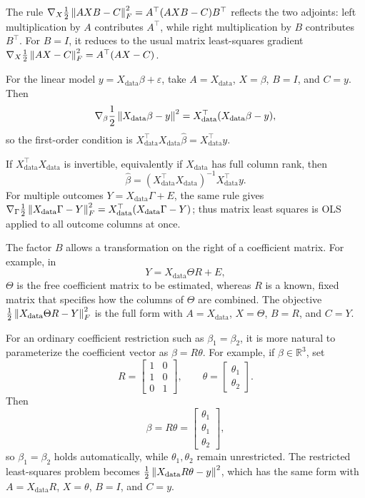 \begin{remark}
The rule $\nabla_X\frac12\left\lVert AXB-C \right\rVert_F^2
=A^\top(AXB-C)B^\top$ reflects the two adjoints: left multiplication by $A$
contributes $A^\top$, while right multiplication by $B$ contributes $B^\top$.
For $B=I$, it reduces to the usual matrix least-squares gradient
$\nabla_X\frac12\left\lVert AX-C \right\rVert_F^2=A^\top(AX-C)$.

For the linear model $y=X_{\mathrm{data}}\beta+\varepsilon$, take
$A=X_{\mathrm{data}}$, $X=\beta$, $B=I$, and $C=y$. Then
\[
    \nabla_\beta\frac12\left\lVert X_{\mathrm{data}}\beta-y \right\rVert^2
    =X_{\mathrm{data}}^\top(X_{\mathrm{data}}\beta-y),
\]
so the first-order condition is
$X_{\mathrm{data}}^\top X_{\mathrm{data}}\hat\beta
=X_{\mathrm{data}}^\top y$. 

If
$X_{\mathrm{data}}^\top X_{\mathrm{data}}$ is invertible, equivalently if
$X_{\mathrm{data}}$ has full column rank, then
\[
    \hat\beta
    =(X_{\mathrm{data}}^\top X_{\mathrm{data}})^{-1}
      X_{\mathrm{data}}^\top y.
\]
For multiple outcomes $Y=X_{\mathrm{data}}\Gamma+E$, the same rule gives
$\nabla_\Gamma\frac12\left\lVert X_{\mathrm{data}}\Gamma-Y \right\rVert_F^2
=X_{\mathrm{data}}^\top(X_{\mathrm{data}}\Gamma-Y)$; thus matrix least
squares is OLS applied to all outcome columns at once.

The factor $B$ allows a transformation on the right of a coefficient matrix.
For example, in
\[
    Y=X_{\mathrm{data}}\Theta R+E,
\]
$\Theta$ is the free coefficient matrix to be estimated, whereas $R$ is a
known, fixed matrix that specifies how the columns of $\Theta$ are combined.
The objective $\frac12\left\lVert X_{\mathrm{data}}\Theta R-Y \right\rVert_F^2$ is the full
form with $A=X_{\mathrm{data}}$, $X=\Theta$, $B=R$, and $C=Y$.

For an ordinary coefficient restriction such as $\beta_1=\beta_2$, it is more
natural to parameterize the coefficient vector as $\beta=R\theta$. For example,
if $\beta\in\mathbb{R}^3$, set
\[
    R=
    \begin{bmatrix}
        1&0\\
        1&0\\
        0&1
    \end{bmatrix},
    \qquad
    \theta=
    \begin{bmatrix}
        \theta_1\\
        \theta_2
    \end{bmatrix}.
\]
Then
\[
    \beta=R\theta
    =
    \begin{bmatrix}
        \theta_1\\
        \theta_1\\
        \theta_2
    \end{bmatrix},
\]
so $\beta_1=\beta_2$ holds automatically, while $\theta_1,\theta_2$ remain
unrestricted. The restricted least-squares problem becomes
$\frac12\left\lVert X_{\mathrm{data}}R\theta-y \right\rVert^2$, which has the same form with
$A=X_{\mathrm{data}}R$, $X=\theta$, $B=I$, and $C=y$.


\end{remark}
